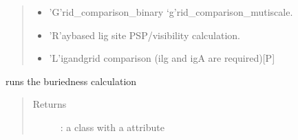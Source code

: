 \documentclass[letterpaper,10pt,english]{sphinxmanual}
\begin{document}
\begin{fulllineitems}
\begin{fulllineitems}
\begin{quote}
\begin{description}
\begin{itemize}
\begin{itemize}
\item {} 
’G’rid\_comparison\_binary ‘g’rid\_comparison\_mutiscale.

\item {} 
’R’ay\sphinxhyphen{}based lig site PSP/visibility calculation.

\item {} 
’L’igand\sphinxhyphen{}grid comparison (\sphinxhyphen{}ilg and \sphinxhyphen{}igA are required){[}P{]}

\end{itemize}


\end{itemize}

\end{description}\end{quote}

\end{fulllineitems}


\begin{fulllineitems}
\label{\detokenize{calculation_api:hotspots.calculation.Buriedness.calculate}}
runs the buriedness calculation
\begin{quote}\begin{description}
\item[{Returns}] \leavevmode
{}: a class with a  attribute

\end{description}\end{quote}

\end{fulllineitems}


\end{fulllineitems}

\end{document}
